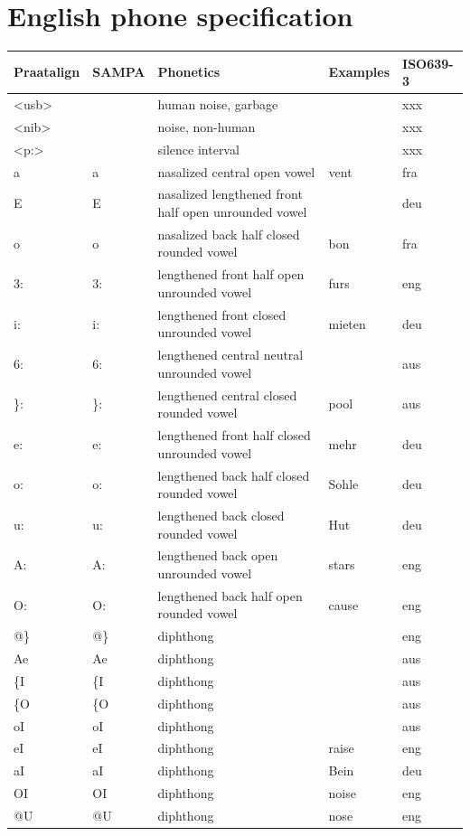 \documentclass[twoside,a4paper]{book}
\begin{document}
\section{English phone specification}
\label{sec:slenglish}
\begin{longtable}{llp{}ll}
	Praatalign & SAMPA & Phonetics & Examples & ISO639-3\\
	\hline
	\textless usb\textgreater &  & human noise, garbage &  & xxx\\
	\textless nib\textgreater &  & noise, non-human &  & xxx\\
	\textless p:\textgreater &  & silence interval &  & xxx\\
	a~ & a~ & nasalized central open vowel & vent & fra\\
	E~ & E~ & nasalized lengthened front half open unrounded vowel &  & deu\\
	o~ & o~ & nasalized back half closed rounded vowel & bon & fra\\
	3: & 3: & lengthened front half open unrounded vowel & furs & eng\\
	i: & i: & lengthened front closed unrounded vowel &  mieten & deu\\
	6: & 6: & lengthened central neutral unrounded vowel &  & aus\\
	\}: & \}: & lengthened central closed rounded vowel & pool & aus\\
	e: & e: & lengthened front half closed unrounded vowel & mehr & deu\\
	o: & o: & lengthened back half closed rounded vowel & Sohle & deu\\
	u: & u: & lengthened back closed rounded vowel & Hut & deu\\
	A: & A: & lengthened back open unrounded vowel & stars & eng\\
	O: & O: & lengthened back half open rounded vowel & cause & eng\\
	@\} & @\} & diphthong &  & eng\\
	Ae & Ae & diphthong &  & aus\\
	\{I & \{I & diphthong &  & aus\\
	\{O & \{O & diphthong &  & aus\\
	oI & oI & diphthong &  & aus\\
	eI & eI & diphthong & raise & eng\\
	aI & aI & diphthong & Bein & deu\\
	OI & OI & diphthong & noise & eng\\
	@U & @U & diphthong & nose & eng\\

\end{longtable}
\end{document}
